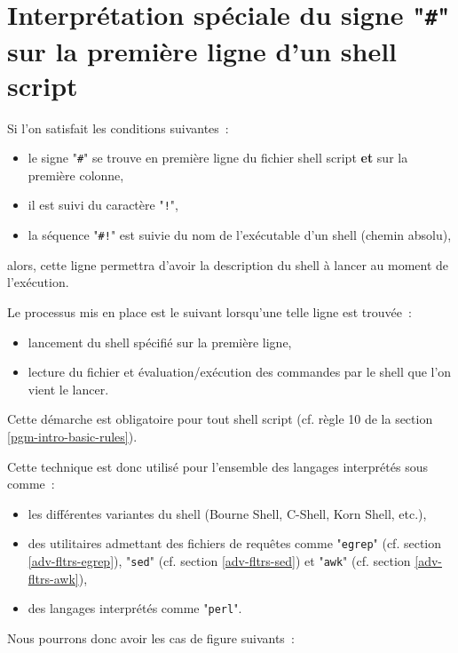 \section{Interpr{\'e}tation sp{\'e}ciale du signe "\texttt{\#}" sur la premi{\`e}re ligne d'un shell script}

Si l'on satisfait les conditions suivantes~:
\begin{itemize}
	\item	le signe "\verb=#=" se trouve en premi{\`e}re ligne du fichier shell script {\bf et}
			sur la premi{\`e}re colonne,
	\item	il est suivi du caract{\`e}re "\verb=!=",
	\item	la s{\'e}quence "\verb=#!=" est suivie du nom de l'ex{\'e}cutable d'un shell (chemin absolu),
\end{itemize}

alors, cette ligne permettra d'avoir la description du shell {\`a} lancer au moment de l'ex{\'e}cution.

Le processus mis en place est le suivant lorsqu'une telle ligne est trouv{\'e}e~:
\begin{itemize}
	\item	lancement du shell sp{\'e}cifi{\'e} sur la premi{\`e}re ligne,
	\item	lecture du fichier et {\'e}valuation/ex{\'e}cution des commandes par le shell que l'on
			vient le lancer.
\end{itemize}

Cette d{\'e}marche est obligatoire pour tout shell script (cf. r{\`e}gle 10 de la section \ref{pgm-intro-basic-rules}).

Cette technique est donc utilis{\'e} pour l'ensemble des langages interpr{\'e}t{\'e}s sous {\Unix} comme~:
\begin{itemize}
	\item	les diff{\'e}rentes variantes du shell (Bourne Shell, C-Shell, Korn Shell, etc.),
	\item	des utilitaires admettant des fichiers de requ{\^e}tes comme "\texttt{egrep}" (cf. section \ref{adv-fltrs-egrep}),
			"\texttt{sed}" (cf. section \ref{adv-fltrs-sed}) et "\texttt{awk}" (cf. section \ref{adv-fltrs-awk}),
	\item	des langages interpr{\'e}t{\'e}s comme "\texttt{perl}"\cite{learning-perl,programming-perl,advpgm-perl}.
\end{itemize}

Nous pourrons donc avoir les cas de figure suivants~:

